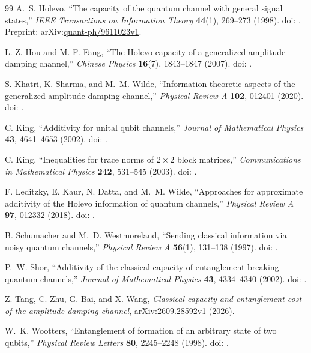 \begin{thebibliography}{99}
A.~S. Holevo,
``The capacity of the quantum channel with general signal states,''
\emph{IEEE Transactions on Information Theory} \textbf{44}(1),
269--273 (1998).
doi: .
Preprint: arXiv:\href{https://arxiv.org/abs/quant-ph/9611023v1}{quant-ph/9611023v1}.

L.-Z. Hou and M.-F. Fang,
``The Holevo capacity of a generalized amplitude-damping channel,''
\emph{Chinese Physics} \textbf{16}(7), 1843--1847 (2007).
doi: .

S. Khatri, K. Sharma, and M.~M. Wilde,
``Information-theoretic aspects of the generalized amplitude-damping channel,''
\emph{Physical Review A} \textbf{102}, 012401 (2020).
doi: .

C. King,
``Additivity for unital qubit channels,''
\emph{Journal of Mathematical Physics} \textbf{43}, 4641--4653 (2002).
doi: .

C. King,
``Inequalities for trace norms of $2\times2$ block matrices,''
\emph{Communications in Mathematical Physics} \textbf{242}, 531--545 (2003).
doi: .

F. Leditzky, E. Kaur, N. Datta, and M.~M. Wilde,
``Approaches for approximate additivity of the Holevo information of quantum channels,''
\emph{Physical Review A} \textbf{97}, 012332 (2018).
doi: .

B. Schumacher and M.~D. Westmoreland,
``Sending classical information via noisy quantum channels,''
\emph{Physical Review A} \textbf{56}(1), 131--138 (1997).
doi: .

P.~W. Shor,
``Additivity of the classical capacity of entanglement-breaking quantum channels,''
\emph{Journal of Mathematical Physics} \textbf{43}, 4334--4340 (2002).
doi: .

Z. Tang, C. Zhu, G. Bai, and X. Wang,
\emph{Classical capacity and entanglement cost of the amplitude damping channel},
arXiv:\href{https://arxiv.org/abs/2609.28592v1}{2609.28592v1} (2026).

W.~K. Wootters,
``Entanglement of formation of an arbitrary state of two qubits,''
\emph{Physical Review Letters} \textbf{80}, 2245--2248 (1998).
doi: .

\end{thebibliography}
